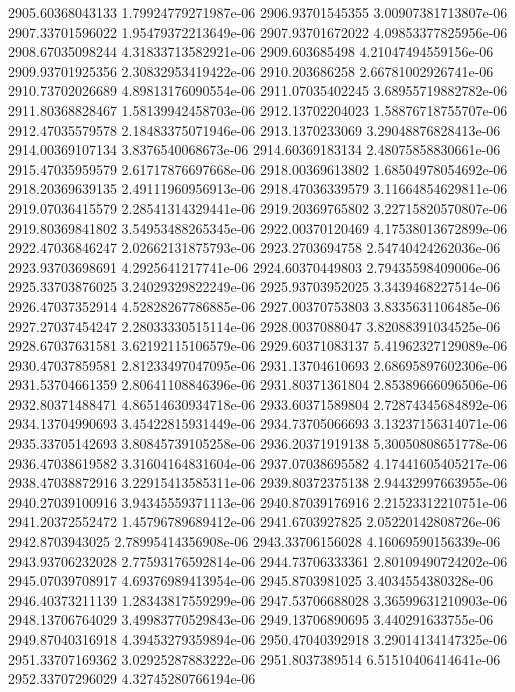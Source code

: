 {2905.60368043133 1.79924779271987e-06
2906.93701545355 3.00907381713807e-06
2907.33701596022 1.95479372213649e-06
2907.93701672022 4.09853377825956e-06
2908.67035098244 4.31833713582921e-06
2909.603685498 4.21047494559156e-06
2909.93701925356 2.30832953419422e-06
2910.203686258 2.66781002926741e-06
2910.73702026689 4.89813176090554e-06
2911.07035402245 3.68955719882782e-06
2911.80368828467 1.58139942458703e-06
2912.13702204023 1.58876718755707e-06
2912.47035579578 2.18483375071946e-06
2913.1370233069 3.29048876828413e-06
2914.00369107134 3.8376540068673e-06
2914.60369183134 2.48075858830661e-06
2915.47035959579 2.61717876697668e-06
2918.00369613802 1.68504978054692e-06
2918.20369639135 2.49111960956913e-06
2918.47036339579 3.11664854629811e-06
2919.07036415579 2.28541314329441e-06
2919.20369765802 3.22715820570807e-06
2919.80369841802 3.54953488265345e-06
2922.00370120469 4.17538013672899e-06
2922.47036846247 2.02662131875793e-06
2923.2703694758 2.54740424262036e-06
2923.93703698691 4.2925641217741e-06
2924.60370449803 2.79435598409006e-06
2925.33703876025 3.24029329822249e-06
2925.93703952025 3.3439468227514e-06
2926.47037352914 4.52828267786885e-06
2927.00370753803 3.8335631106485e-06
2927.27037454247 2.28033330515114e-06
2928.0037088047 3.82088391034525e-06
2928.67037631581 3.62192115106579e-06
2929.60371083137 5.41962327129089e-06
2930.47037859581 2.81233497047095e-06
2931.13704610693 2.68695897602306e-06
2931.53704661359 2.80641108846396e-06
2931.80371361804 2.85389666096506e-06
2932.80371488471 4.86514630934718e-06
2933.60371589804 2.72874345684892e-06
2934.13704990693 3.45422815931449e-06
2934.73705066693 3.13237156314071e-06
2935.33705142693 3.80845739105258e-06
2936.20371919138 5.30050808651778e-06
2936.47038619582 3.31604164831604e-06
2937.07038695582 4.17441605405217e-06
2938.47038872916 3.22915413585311e-06
2939.80372375138 2.94432997663955e-06
2940.27039100916 3.94345559371113e-06
2940.87039176916 2.21523312210751e-06
2941.20372552472 1.45796789689412e-06
2941.6703927825 2.05220142808726e-06
2942.8703943025 2.78995414356908e-06
2943.33706156028 4.16069590156339e-06
2943.93706232028 2.77593176592814e-06
2944.73706333361 2.80109490724202e-06
2945.07039708917 4.69376989413954e-06
2945.8703981025 3.4034554380328e-06
2946.40373211139 1.28343817559299e-06
2947.53706688028 3.36599631210903e-06
2948.13706764029 3.49983770529843e-06
2949.13706890695 3.440291633755e-06
2949.87040316918 4.39453279359894e-06
2950.47040392918 3.29014134147325e-06
2951.33707169362 3.02925287883222e-06
2951.8037389514 6.51510406414641e-06
2952.33707296029 4.32745280766194e-06
}
